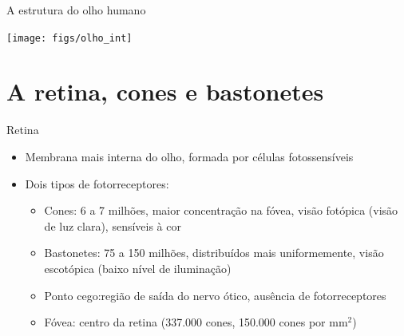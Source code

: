       \begin{slide}[toc=]{A estrutura do olho humano}
         \begin{center}
            \texttt{[image: figs/olho\_int]}
         \end{center}
      \end{slide}

   \section[ slide = true]{A retina, cones e bastonetes}
      \begin{slide}[toc=]{Retina}
      \begin{itemize}
         \item Membrana mais interna do olho, formada por células fotossensíveis
         \item Dois tipos de fotorreceptores:
         \begin{itemize}
            \item Cones: 6 a 7 milhões, maior concentração na fóvea, visão fotópica (visão de luz clara),
            sensíveis à cor
            \item Bastonetes: 75 a 150 milhões, distribuídos mais uniformemente, visão escotópica (baixo
            nível de iluminação)
            \item Ponto cego:região de saída do nervo ótico, ausência de fotorreceptores
            \item Fóvea: centro da retina (337.000 cones, 150.000 cones por mm$^2$)
         \end{itemize}
      \end{itemize}
      \end{slide}   

